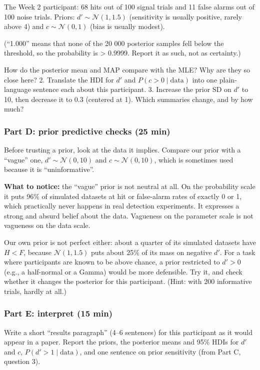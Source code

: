 The Week 2 participant: 68 hits out of 100 signal trials and 11 false
alarms out of 100 noise trials. Priors: \(d' \sim \mathcal{N}(1, 1.5)\)
(sensitivity is usually positive, rarely above 4) and
\(c \sim \mathcal{N}(0, 1)\) (bias is usually modest).

(``1.000'' means that none of the 20 000 posterior samples fell below
the threshold, so the probability is \textgreater{} 0.9999. Report it as
such, not as certainty.)

How do the posterior mean and MAP compare with the MLE? Why are they so
close here? 2. Translate the HDI for \(d'\) and
\(P(c > 0 \mid \text{data})\) into one plain-language sentence each
about this participant. 3. Increase the prior SD on \(d'\) to 10, then
decrease it to 0.3 (centered at 1). Which summaries change, and by how
much?

\subsubsection{Part D: prior predictive checks (25 min)}

Before trusting a prior, look at the data it implies. Compare our prior
with a ``vague'' one, \(d' \sim \mathcal{N}(0, 10)\) and
\(c \sim \mathcal{N}(0, 10)\), which is sometimes used because it is
``uninformative''.

\textbf{What to notice:} the ``vague'' prior is not neutral at all. On
the probability scale it puts 96\% of simulated datasets at hit or
false-alarm rates of exactly 0 or 1, which practically never happens in
real detection experiments. It expresses a strong and absurd belief
about the data. Vagueness on the parameter scale is not vagueness on the
data scale.

Our own prior is not perfect either: about a quarter of its simulated
datasets have \(H < F\), because \(\mathcal{N}(1, 1.5)\) puts about 25\%
of its mass on negative \(d'\). For a task where participants are known
to be above chance, a prior restricted to \(d' > 0\) (e.g., a
half-normal or a Gamma) would be more defensible. Try it, and check
whether it changes the posterior for this participant. (Hint: with 200
informative trials, hardly at all.)

\subsubsection{Part E: interpret (15 min)}

Write a short ``results paragraph'' (4--6 sentences) for this
participant as it would appear in a paper. Report the priors, the
posterior means and 95\% HDIs for \(d'\) and \(c\),
\(P(d' > 1 \mid \text{data})\), and one sentence on prior sensitivity
(from Part C, question 3).

